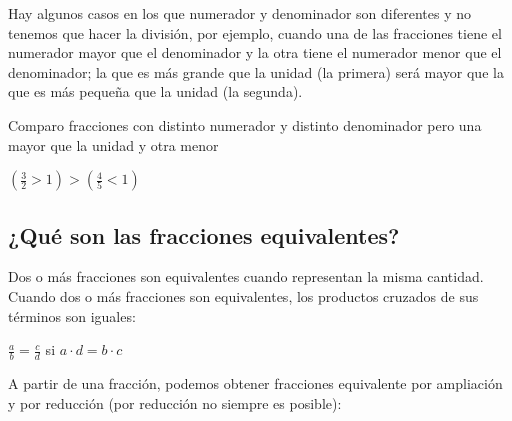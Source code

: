 Hay algunos casos en los que numerador y denominador son diferentes y no tenemos que hacer la división, por ejemplo, cuando una de las fracciones tiene el numerador mayor que el denominador y la otra tiene el numerador menor que el denominador; la que es más grande que la unidad (la primera) será mayor que la que es más pequeña que la unidad (la segunda).

\begin{ejemplos}[label={Ejemplo:mayorMenorUnidad}]{Comparo fracciones con distinto numerador y distinto denominador pero una mayor que la unidad y otra menor}
    \begin{center}
        $\displaystyle \left( \frac{3}{2} > 1 \right) > \left( \frac{4}{5} < 1 \right) $
    \end{center}
\end{ejemplos}

\subsection{¿Qué son las fracciones equivalentes?}

Dos o más fracciones son equivalentes cuando representan la misma cantidad. Cuando dos o más fracciones son equivalentes, los productos cruzados de sus términos son iguales:

\begin{center}
    $\displaystyle \frac{a}{b} = \frac{c}{d}$ \quad si \quad $a \cdot d = b \cdot c$
\end{center}

A partir de una fracción, podemos obtener fracciones equivalente por ampliación y por reducción (por reducción no siempre es posible):

